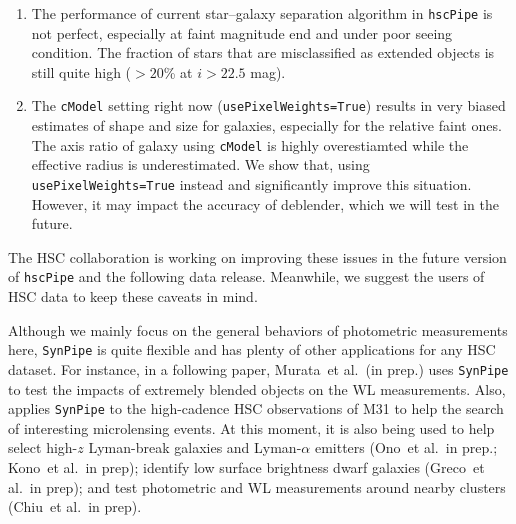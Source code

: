 \documentclass[useamsfonts]{pasj01}
\def\etal{{\ et al.~}}
\def\hscpipe{\texttt{hscPipe}}
\def\synpipe{\texttt{SynPipe}}
\def\cmodel{\texttt{cModel}}
\begin{document}
    \begin{enumerate}
    
        \item The performance of current star--galaxy separation algorithm in \hscpipe{}
            is not perfect, especially at faint magnitude end and under poor seeing 
            condition.  
            The fraction of stars that are misclassified as extended objects is still 
            quite high ($>20$\% at $i> 22.5$ mag).
        
        \item The \cmodel{} setting right now (\texttt{usePixelWeights=True}) results 
            in very biased estimates of shape and size for galaxies, especially for the 
            relative faint ones. 
            The axis ratio of galaxy using \cmodel{} is highly overestiamted while 
            the effective radius is underestimated. 
            We show that, using \texttt{usePixelWeights=True} instead and significantly 
            improve this situation. 
            However, it may impact the accuracy of deblender, which we will test in the 
            future. 
    
    \end{enumerate}
    
    The HSC collaboration is working on improving these issues in the future version 
    of \hscpipe{} and the following data release.  
    Meanwhile, we suggest the users of HSC data to keep these caveats in mind. 
    
    Although we mainly focus on the general behaviors of photometric measurements here, 
    \synpipe{} is quite flexible and has plenty of other applications for any HSC 
    dataset.  
    For instance, in a following paper, Murata\etal (in prep.) uses \synpipe{} to test 
    the impacts of extremely blended objects on the WL measurements. 
    Also, \citep{Niikura2017} applies \synpipe{} to the high-cadence HSC observations 
    of M31 to help the search of interesting microlensing events. 
    At this moment, it is also being used to help select high-$z$ Lyman-break galaxies 
    and Lyman-$\alpha$ emitters (Ono\etal in prep.; Kono\etal in prep); identify 
    low surface brightness dwarf galaxies (Greco\etal in prep); and test photometric 
    and WL measurements around nearby clusters (Chiu\etal in prep).   
    
\end{document}
